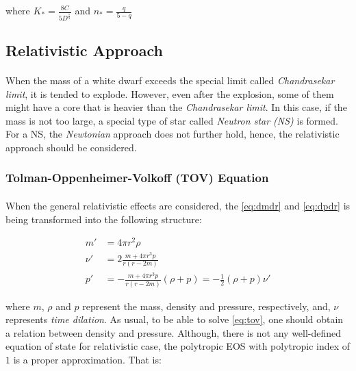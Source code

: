 \documentclass[letterpaper,12pt]{article}
\begin{document}
where $K_* = \frac{8C}{5D^{\frac{5}{q}}}$ and $n_* = \frac{q}{5-q}$

\subsection{Relativistic Approach}

\paragraph{} When the mass of a white dwarf exceeds the special limit called \textit{Chandrasekar limit}, it is tended to explode. However, even after the explosion, some of them might have a core that is heavier than the \textit{Chandrasekar limit}. In this case, if the mass is not too large, a special type of star called \textit{Neutron star (NS)} is formed. For a NS, the \textit{Newtonian} approach does not further hold, hence, the relativistic approach should be considered.

\subsubsection{Tolman-Oppenheimer-Volkoff (TOV) Equation}
\label{sec:tov}
\paragraph{} When the general relativistic effects are considered, the \eqref{eq:dmdr} and \eqref{eq:dpdr} is being transformed into the following structure:

\begin{equation}
\begin{aligned}
    \label{eq:tov}
    m' &= 4 \pi r^2 \rho \\
    \nu' &= 2 \frac{m + 4 \pi r^3 p}{r \left(r - 2m\right)} \\
    p' &= -\frac{m + 4 \pi r^3 p}{r \left(r - 2m\right)} \left(\rho + p\right) = -\frac{1}{2}\left(\rho + p\right)\nu'
\end{aligned}
\end{equation}

where $m$, $\rho$ and $p$ represent the mass, density and pressure, respectively, and, $\nu$ represents \textit{time dilation}. As usual, to be able to solve \eqref{eq:tov}, one should obtain a relation between density and pressure. Although, there is not any well-defined equation of state for relativistic case, the polytropic EOS with polytropic index of $1$ is a proper approximation. That is:
\end{document}
